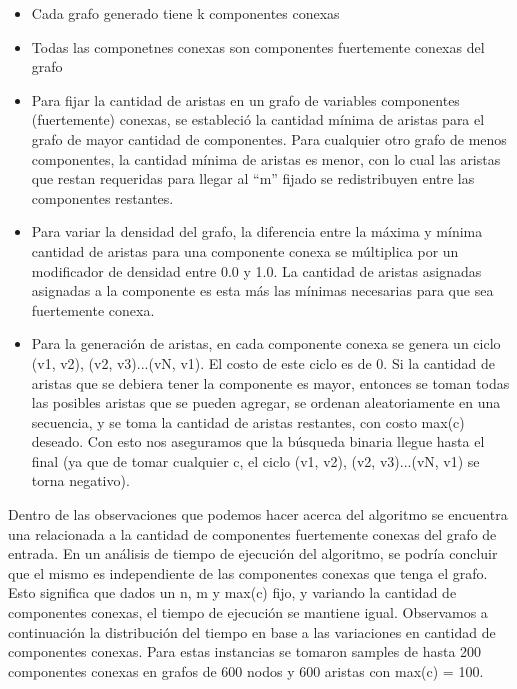 \begin{itemize}  
\item Cada grafo generado tiene k componentes conexas
\item Todas las componetnes conexas son componentes fuertemente conexas del grafo
\item Para fijar la cantidad de aristas en un grafo de variables componentes (fuertemente) conexas, se estableció la cantidad mínima de aristas para el grafo de mayor cantidad de componentes. Para cualquier otro grafo de menos componentes, la cantidad mínima de aristas es menor, con lo cual las aristas que restan requeridas para llegar al “m” fijado se redistribuyen entre las componentes restantes.
\item Para variar la densidad del grafo, la diferencia entre la máxima y mínima cantidad de aristas para una componente conexa se múltiplica por un modificador de densidad entre 0.0 y 1.0. La cantidad de aristas asignadas asignadas a la componente es esta más las mínimas necesarias para que sea fuertemente conexa.
\item Para la generación de aristas, en cada componente conexa se genera un ciclo (v1, v2), (v2, v3)...(vN, v1). El costo de este ciclo es de 0. Si la cantidad de aristas que se debiera tener la componente es mayor, entonces se toman todas las posibles aristas que se pueden agregar, se ordenan aleatoriamente en una secuencia, y se toma la cantidad de aristas restantes, con costo max(c) deseado. Con esto nos aseguramos que la búsqueda binaria llegue hasta el final (ya que de tomar cualquier c, el ciclo (v1, v2), (v2, v3)...(vN, v1) se torna negativo).
 

\end{itemize}

Dentro de las observaciones que podemos hacer acerca del algoritmo se encuentra una relacionada a la cantidad de componentes fuertemente conexas del grafo de entrada. En un análisis de tiempo de ejecución del algoritmo, se podría concluir que el mismo es independiente de las componentes conexas que tenga el grafo. Esto significa que dados un n, m y max(c) fijo, y variando la cantidad de componentes conexas, el tiempo de ejecución se mantiene igual. Observamos a continuación la distribución del tiempo en base a las variaciones en cantidad de componentes conexas. Para estas instancias se tomaron samples de hasta 200 componentes conexas en grafos de 600 nodos y 600 aristas con max(c) = 100.\\


